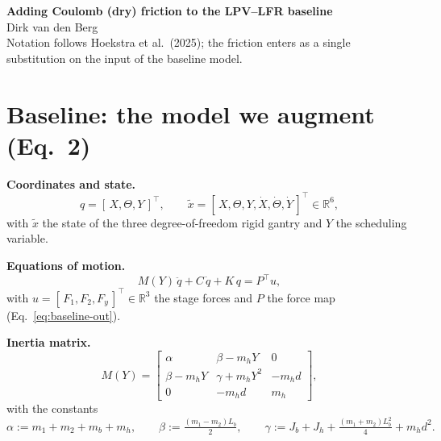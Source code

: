 \documentclass[11pt]{article}
\newcommand{\R}{\mathbb{R}}
\newcommand{\xb}{\tilde{x}}
\begin{document}
\begin{center}
  {\LARGE\bfseries Adding Coulomb (dry) friction to the LPV--LFR baseline}\\[0.4em]
  {\large Dirk van den Berg}\\[0.2em]
  {\small Notation follows Hoekstra et al.\ (2025); the friction enters as a single
   substitution on the input of the baseline model.}
\end{center}
\vspace{0.4em}

\section{Baseline: the model we augment \quad (Eq.~2)}

\noindent\textbf{Coordinates and state.}
\begin{equation}
  q = [\,X,\Theta,Y\,]^\top , \qquad
  \xb = [\,X,\Theta,Y,\dot X,\dot\Theta,\dot Y\,]^\top \in \R^6 ,
  \label{eq:baseline-state}
\end{equation}
with $\xb$ the state of the three degree-of-freedom rigid gantry and $Y$ the scheduling
variable.

\medskip\noindent\textbf{Equations of motion.}
\begin{equation}
  M(Y)\,\ddot q + C\,\dot q + K\,q = P^\top u ,
  \label{eq:baseline-eom}
\end{equation}
with $u = [\,F_1,F_2,F_y\,]^\top \in \R^3$ the stage forces and $P$ the force map
(Eq.~\ref{eq:baseline-out}).

\medskip\noindent\textbf{Inertia matrix.}
\begin{equation}
  M(Y) =
  \begin{bmatrix}
    \alpha            & \beta - m_h Y      & 0 \\[2mm]
    \beta - m_h Y     & \gamma + m_h Y^2   & -m_h d \\[2mm]
    0                 & -m_h d             & m_h
  \end{bmatrix},
  \label{eq:baseline-M}
\end{equation}
with the constants
\begin{equation}
  \alpha := m_1{+}m_2{+}m_b{+}m_h , \qquad
  \beta  := \tfrac{(m_1-m_2)L_b}{2} , \qquad
  \gamma := J_b{+}J_h{+}\tfrac{(m_1+m_2)L_b^2}{4}{+}m_h d^2 .
  \label{eq:baseline-consts}
\end{equation}
\end{document}
